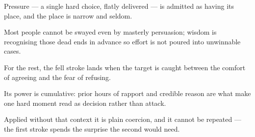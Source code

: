 

\begin{distilled}
  \item Pressure --- a single hard choice, flatly delivered --- is admitted as having its place, and the place is narrow and seldom.
  \item Most people cannot be swayed even by masterly persuasion; wisdom is recognising those dead ends in advance so effort is not poured into unwinnable cases.
  \item For the rest, the fell stroke lands when the target is caught between the comfort of agreeing and the fear of refusing.
  \item Its power is cumulative: prior hours of rapport and credible reason are what make one hard moment read as decision rather than attack.
  \item Applied without that context it is plain coercion, and it cannot be repeated --- the first stroke spends the surprise the second would need.
\end{distilled}
